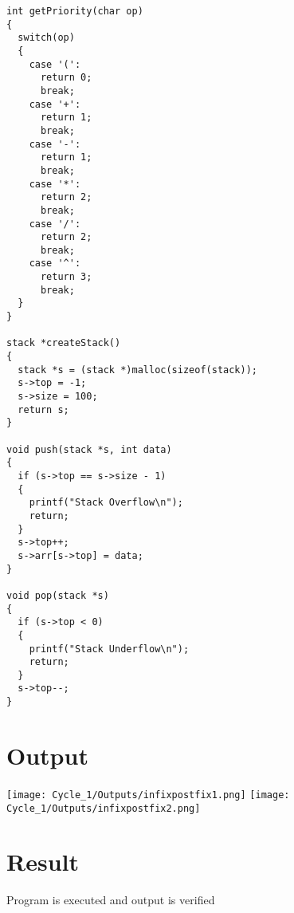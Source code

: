 \begin{lstlisting}[label={list:c_program:infix-postfix}]
int getPriority(char op)
{
  switch(op)
  {
    case '(':
      return 0;
      break;
    case '+': 
      return 1;
      break;
    case '-': 
      return 1;
      break;
    case '*': 
      return 2;
      break;
    case '/': 
      return 2;
      break;
    case '^': 
      return 3;
      break;
  }
}

stack *createStack()
{
  stack *s = (stack *)malloc(sizeof(stack));
  s->top = -1;
  s->size = 100;
  return s;
}

void push(stack *s, int data)
{
  if (s->top == s->size - 1)
  {
    printf("Stack Overflow\n");
    return;
  }
  s->top++;
  s->arr[s->top] = data;
}

void pop(stack *s)
{
  if (s->top < 0)
  {
    printf("Stack Underflow\n");
    return;
  }
  s->top--;
}
\end{lstlisting}

\section{Output}
\texttt{[image: Cycle\_1/Outputs/infixpostfix1.png]}
\texttt{[image: Cycle\_1/Outputs/infixpostfix2.png]}

\section{Result}
Program is executed and output is verified

